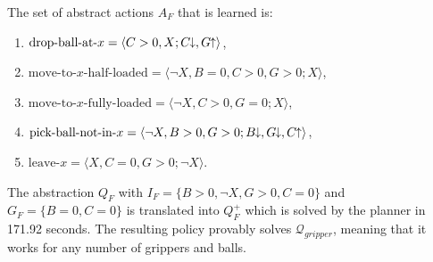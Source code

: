 \documentclass[letterpaper]{article} %
\newcommand{\Omit}[1]{}
\newcommand{\tup}[1]{\langle #1 \rangle}
\newcommand{\Q}{\mathcal{Q}}
\newcommand{\abst}[2]{\tup{#1;#2}}
\newcommand{\pplus}{\hspace{-.05em}\raisebox{.15ex}{\footnotesize$\uparrow$}}
\newcommand{\mminus}{\hspace{-.05em}\raisebox{.15ex}{\footnotesize$\downarrow$}}
\begin{document}
\noindent The set of  abstract actions $A_F$  that is learned is:

\begin{enumerate}[--]
  \item $\text{drop-ball-at-$x$}=\abst{C>0, X}{C\mminus, G \pplus}$,
  \item $\text{move-to-$x$-half-loaded}\! =\!  \abst{\neg X, B=0, C>0, G\!>\!0}{X}$,
  \item $\text{move-to-$x$-fully-loaded} = \abst{\neg X, C>0, G=0}{X}$,
  \item $\text{pick-ball-not-in-$x$} = \abst{\neg X, B > 0, G > 0}{B\mminus, G\mminus, C\pplus}$,
  \item $\text{leave-$x$} = \abst{X, C=0, G > 0}{\neg X}$.
\end{enumerate}

The abstraction $Q_F$ with $I_F\!=\!\{ B\!>\!0, \neg X, G\!>\!0, C\!=\!0\}$ and $G_F\!=\!\{ B\!=\!0, C\!=\!0 \}$ is
translated into $Q^+_F$ which is solved by the planner in 171.92 seconds.
The resulting policy provably solves $\Q_{gripper}$, meaning that
it works for any  number of grippers and balls.
\Omit{ %
The policy picks the balls in the source room, one by one, 
until the grippers are full or there are no more balls.
It then moves to the target room, with one of the two move actions above, 
according to whether the grippers are fully loaded or not,
and then drops the balls one by one, until the grippers
are all empty.  It then moves back to the other room if there
are still  balls to be moved, repeating the process.
}

\end{document}
